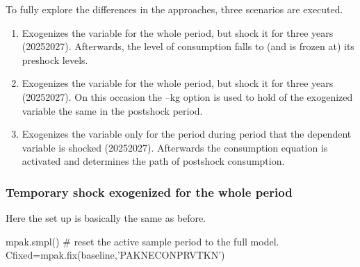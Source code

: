 \documentclass[letterpaper,10pt,english]{jupyterBook}
\begin{document}
\sphinxAtStartPar
To fully explore the differences in the approaches, three scenarios are executed.
\begin{enumerate}
%
\item {} 
\sphinxAtStartPar
Exogenizes the variable for the whole period, but shock it for three years (2025\sphinxhyphen{}2027). Afterwards, the level of consumption falls to (and is frozen at) its pre\sphinxhyphen{}shock levels.

\item {} 
\sphinxAtStartPar
Exogenizes the variable for the whole period, but shock it for three years (2025\sphinxhyphen{}2027). On this occasion the –kg option is used to hold  of the exogenized variable the same in the post\sphinxhyphen{}shock period.

\item {} 
\sphinxAtStartPar
Exogenizes the variable only for the period during period that the dependent variable is shocked (2025\sphinxhyphen{}2027). Afterwards the consumption equation is activated and determines the path of post\sphinxhyphen{}shock consumption.

\end{enumerate}


\subsubsection{Temporary shock exogenized for the whole period}
\label{\detokenize{content/06_WBModels/ScenarioAnalysis:temporary-shock-exogenized-for-the-whole-period}}
\sphinxAtStartPar
Here the set up is basically the same as before.

\sphinxAtStartPar
mpak.smpl() \# reset the active sample period to the full model.
Cfixed=mpak.fix(baseline,’PAKNECONPRVTKN’)
\end{document}
